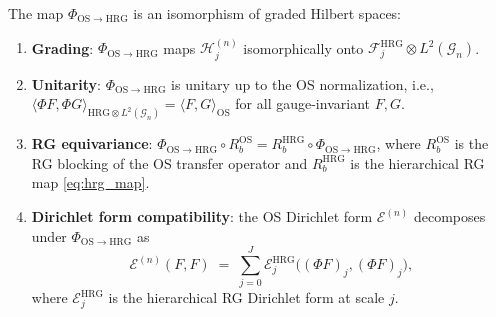 \begin{theorem}
\label{thm:os_hrg_iso}
The map $\Phi_{\mathrm{OS}\to\mathrm{HRG}}$ is an isomorphism of
graded Hilbert spaces:
\begin{enumerate}
\item \textbf{Grading}: $\Phi_{\mathrm{OS}\to\mathrm{HRG}}$ maps
$\mathcal{H}_{j}^{(n)}$ isomorphically onto
$\mathcal{F}_{j}^{\mathrm{HRG}}\otimes L^{2}(\mathcal{G}_{n})$.
\item \textbf{Unitarity}: $\Phi_{\mathrm{OS}\to\mathrm{HRG}}$ is
unitary up to the OS normalization, i.e.,
$\langle\Phi F,\Phi G\rangle_{\mathrm{HRG}\otimes L^{2}(\mathcal{G}
_{n})}=\langle F,G\rangle_{\mathrm{OS}}$ for all gauge-invariant
$F,G$.
\item \textbf{RG equivariance}:
$\Phi_{\mathrm{OS}\to\mathrm{HRG}}\circ R_{b}^{\mathrm{OS}}=
R_{b}^{\mathrm{HRG}}\circ\Phi_{\mathrm{OS}\to\mathrm{HRG}}$, where
$R_{b}^{\mathrm{OS}}$ is the RG blocking of the OS transfer
operator and $R_{b}^{\mathrm{HRG}}$ is the hierarchical RG map
\eqref{eq:hrg_map}.
\item \textbf{Dirichlet form compatibility}: the OS Dirichlet form
$\mathcal{E}^{(n)}$ decomposes under $\Phi_{\mathrm{OS}\to
\mathrm{HRG}}$ as
\begin{equation}
\label{eq:dirichlet_hrg}
  \mathcal{E}^{(n)}(F,F)
  \;=\;\sum_{j=0}^{J}\mathcal{E}_{j}^{\mathrm{HRG}}
  \bigl((\Phi F)_{j},(\Phi F)_{j}\bigr),
\end{equation}
where $\mathcal{E}_{j}^{\mathrm{HRG}}$ is the hierarchical RG
Dirichlet form at scale $j$.
\end{enumerate}
\end{theorem}

